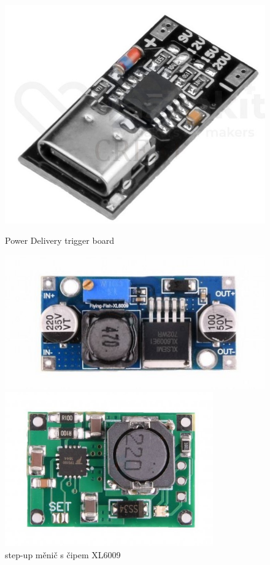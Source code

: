 \begin{figure}[htb]
  \centering
  \begin{minipage}{0.3\textwidth}
    \centering
  \includegraphics[width=1\textwidth]{img/PDtrig.jpg}
  \caption{\label{fig:PDtrig} Power Delivery trigger board~\cite{laskakit-PD}}
  \end{minipage}\hfill
  \begin{minipage}{0.3\textwidth}
    \centering
  \includegraphics[width=1\textwidth]{img/XL6009.jpg}
  \caption{\label{fig:XL6009} step-up měnič s čipem XL6009~\cite{laskakit-XL6009}}
  \end{minipage}
  \begin{minipage}{0.3\textwidth}
    \centering
    \includegraphics[width=0.8\textwidth]{img/TP5100.jpg}

\end{minipage}
\end{figure}
